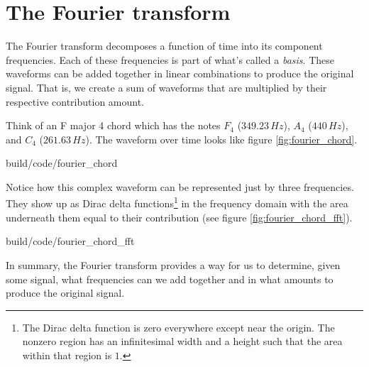\section{The Fourier transform}

The Fourier transform decomposes a function of time into its component
frequencies. Each of these frequencies is part of what's called a
\textit{basis}. These waveforms can be added together in linear combinations to
produce the original signal. That is, we create a sum of waveforms that are
multiplied by their respective contribution amount.

Think of an F major 4 chord which has the notes $F_4$ ($349.23\,Hz$), $A_4$
($440\,Hz$), and $C_4$ ($261.63\,Hz$). The waveform over time looks like figure
\ref{fig:fourier_chord}.

\begin{svg}{build/code/fourier_chord}
  \caption{Frequency decomposition of Fmajor4 chord}
  \label{fig:fourier_chord}
\end{svg}

Notice how this complex waveform can be represented just by three frequencies.
They show up as Dirac delta functions\footnote{The Dirac delta function is zero
everywhere except near the origin. The nonzero region has an infinitesimal width
and a height such that the area within that region is $1$.} in the frequency
domain with the area underneath them equal to their contribution (see figure
\ref{fig:fourier_chord_fft}).

\begin{svg}{build/code/fourier_chord_fft}
  \caption{Fourier transform of Fmajor4 chord}
  \label{fig:fourier_chord_fft}
\end{svg}

In summary, the Fourier transform provides a way for us to determine, given some
signal, what frequencies can we add together and in what amounts to produce the
original signal.
